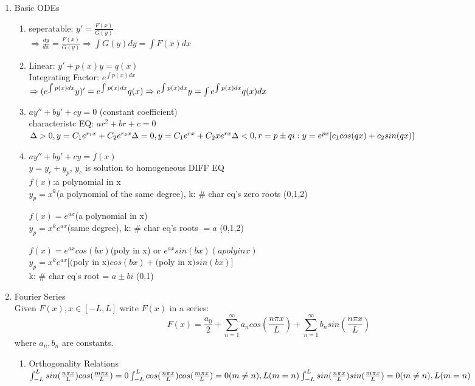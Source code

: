 \documentclass[10pt]{article}
\begin{document}
  
\begin{multicols}{2}
	
\begin{enumerate}
	\item Basic ODEs
	\begin{enumerate}
		\item seperatable: $y'= \frac{F(x)}{G(y)}$\\
		$\Rightarrow \frac{dy}{dx} = \frac{F(x)}{G(y)} \Rightarrow \int G(y)dy = \int F(x)dx$
		
		\item Linear: $y'+p(x)y = q(x)$\\
		Integrating Factor: $e^{\int p(x)dx}$\\
		$\Rightarrow (e^{\int p(x)dx}y)' = e^{\int p(x)dx}q(x)\\ \Rightarrow
		e^{\int p(x)dx}y = \int e^{\int p(x)dx}q(x)dx$
		
		\item $ay'' + by' + cy = 0$ (constant coefficient)\\
		characteristc EQ: $ar^2 + br + c = 0$\\
		$\Delta > 0, y = C_1e^{r_1x} + C_2e^{r_2x}\\
		\Delta = 0, y = C_1e^{rx} + C_2xe^{rx}\\
		\Delta < 0, r = p \pm qi: y = e^{px}[c_1cos(qx)+c_2sin(qx)]$
		
		\item $ay'' + by' + cy = f(x)$ \\
		$y = y_c + y_p$, $y_c$ is solution to homogeneous DIFF EQ\\
		$f(x)$:a polynomial in x\\
		$y_p =  x^k$(a polynomial of the same degree), k: $\#$ char eq's zero roots (0,1,2)
		
		$f(x) = e^{ax}$(a polynomial in x)\\
		$y_p =  x^ke^{ax}$(same degree), k: $\#$ char eq's roots $= a$ (0,1,2)
		
		$f(x) = e^{ax}cos(bx)$(poly in x) or $e^{ax}sin(bx)(a poly in x)$\\
		$y_p = x^ke^{ax} [ ($poly in x$)cos(bx) + ($poly in x$)sin(bx) ]$\\
		k: $\#$ char eq's root = $a \pm bi$ (0,1)
	\end{enumerate}

	\item Fourier Series\\
	Given $F(x), x\in [-L,L]$ write $F(x)$ in a series:
	$$F(x) = \frac{a_0}{2} + \sum_{n = 1}^{\infty}a_n cos(\frac{n\pi x}{L}) + \sum_{n = 1}^{\infty}b_n sin(\frac{n\pi x}{L})$$ where $a_n, b_n$ are constants.
	\begin{enumerate}
		\item  Orthogonality Relations\\
		$\int_{-L}^{L}sin(\frac{n\pi x}{L})cos(\frac{m\pi x}{L}) = 0\\
		\int_{-L}^{L}cos(\frac{n\pi x}{L})cos(\frac{m\pi x}{L}) = 0(m \neq n), L(m = n)\\
		\int_{-L}^{L}sin(\frac{n\pi x}{L})sin(\frac{m\pi x}{L}) = 0(m \neq n), L(m = n)$
		

\end{enumerate}
\end{enumerate}
\end{multicols}
\end{document}
